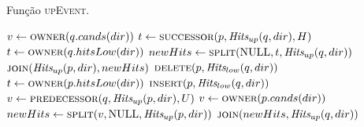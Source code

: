 \begin{algorithm}
    \caption{Função \textsc{upEvent}.}
    \label{parcinetico:eventoup}
\begin{algorithmic}[1]
            \State $v \leftarrow \Call{owner}{q.cands(dir)}$
                \State {}
            \EndIf
            \State {}
            \State $t \leftarrow \Call{successor}{p, \Hits_{up}(q, dir), H}$
                \State $t \leftarrow \Call{owner}{q.hitsLow(dir)}$
            \EndIf
            \State $newHits \leftarrow \Call{split}{\Null, t, \Hits_{up}(q, dir)}$
            \State $\Call{join}{\Hits_{up}(p, dir), newHits}$
            \State $\Call{delete}{p, \Hits_{low}(q, dir)}$
                \State {}
            \EndIf
        \Else
                \State $t \leftarrow \Call{owner}{p.hitsLow(dir)}$
                    \State {}
                \EndIf
                \State $\Call{insert}{p, \Hits_{low}(q, dir)}$
                \State $v \leftarrow \Call{predecessor}{q, \Hits_{up}(p, dir), U}$
                    \State $v \leftarrow \Call{owner}{p.cands(dir)}$
                \EndIf
                \State $newHits \leftarrow \Call{split}{v, \Null, \Hits_{up}(p,dir)}$
                \State $\Call{join}{newHits, \Hits_{up}(q, dir)}$
                \State {}
                    \State {}
                \EndIf
            \EndIf
        \EndIf
    \EndFunction
\end{algorithmic}
\end{algorithm}